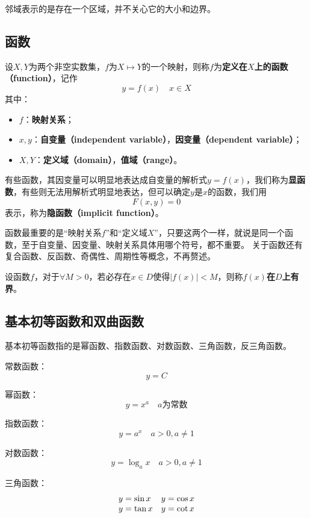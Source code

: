 邻域表示的是存在一个区域，并不关心它的大小和边界。

\subsection{函数}

\begin{definition}[函数]
设$X,Y$为两个非空实数集，$f$为$X\mapsto Y$的一个映射，则称$f$为{\bf 定义在$X$上的函数（function）}，记作
\[
y=f\left( x \right) \quad x\in X
\]
其中：
\begin{itemize}
    \item $f$：{\bf 映射关系}；
    \item $x,y$：{\bf 自变量（independent variable）}，{\bf 因变量（dependent variable）}；
    \item $X,Y$：{\bf 定义域（domain）}，{\bf 值域（range）}。
\end{itemize}
有些函数，其因变量可以明显地表达成自变量的解析式$y=f\left( x \right) $，我们称为{\bf 显函数}，有些则无法用解析式明显地表达，但可以确定$y$是$x$的函数，我们用
\[
F\left( x,y \right) =0
\]
表示，称为{\bf 隐函数（implicit function）}。
\end{definition}

函数最重要的是“映射关系$f$”和“定义域$X$”，只要这两个一样，就说是同一个函数，至于自变量、因变量、映射关系具体用哪个符号，都不重要。
关于函数还有复合函数、反函数、奇偶性、周期性等概念，不再赘述。

\begin{definition}[有界]
设函数$f$，对于$\forall M>0$，若必存在$x\in D$使得$\left| f\left( x \right) \right|<M$，则称{\bf $f\left( x \right) $在$D$上有界}。
\end{definition}

\subsection{基本初等函数和双曲函数}

基本初等函数指的是幂函数、指数函数、对数函数、三角函数，反三角函数。

常数函数：
\[
y=C
\]

幂函数：
\[
y=x^a\quad a\text{为常数}
\]

指数函数：
\[
y=a^x\quad a>0,a\ne 1
\]

对数函数：
\[
y=\log _ax\quad a>0,a\ne 1
\]

三角函数：
\[
\begin{matrix}
	y=\sin x \hfill & y=\cos x \hfill \\
	y=\tan x \hfill & y=\cot x \hfill \\
\end{matrix}
\]

